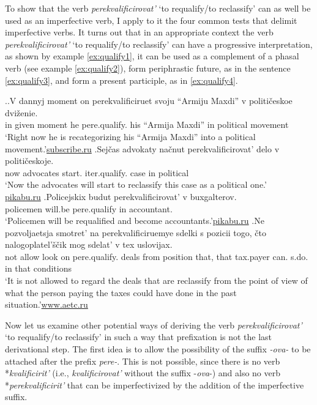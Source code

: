 To show that the verb \textit{perekvalificirovat'} `to requalify/to reclassify' can as well be used as an imperfective verb, I apply to it the four common tests that delimit imperfective verbs. It turns out that in an appropriate context the verb \textit{perekvalificirovat'} `to requalify/to reclassify' can have a progressive interpretation, as shown by example \ref{ex:qualify1}, it can be used as a complement of a phasal verb (see example \ref{ex:qualify2}), form periphrastic future, as in the sentence \ref{ex:qualify3}, and form a present participle, as in \ref{ex:qualify4}. 

\ex.\label{ex:qualify}\ag.\label{ex:qualify1}V dannyj moment on perekvalificiruet\textsuperscript{\IPF} svoju {``Armiju Maxdi''} v politi\v{c}eskoe dvi\v{z}enie.\\
in given moment he pere.qualify. his {``Armija Maxdi''} in political movement\\
\trans `Right now he is recategorizing his ``Armija Maxdi'' into a political movement.'\hbox{}\hfill\hbox{\url{subscribe.ru}}
\bg.\label{ex:qualify2}Sej\v{c}as advokaty na\v{c}nut perekvalificirovat'\textsuperscript{\IPF} delo v politi\v{c}eskoje.\\
now advocates start. iter.qualify. case in political\\
\trans `Now the advocates will start to reclassify this case as a political one.'\\\hbox{}\hfill\hbox{\url{pikabu.ru}}
\bg.\label{ex:qualify3}Policejskix budut perekvalificirovat'\textsuperscript{\IPF} v buxgalterov.\\	
policemen will.be pere.qualify in accountant.\\
\trans `Policemen will be requalified and become accountants.'\hbox{}\hfill\hbox{\url{pikabu.ru}}
\bg.\label{ex:qualify4}Ne pozvoljaetsja smotret’ na perekvalificiruemye sdelki s pozicii togo, \v{c}to nalogoplatel’\v{s}\v{c}ik mog sdelat’ v tex uslovijax.\\
not allow look on pere.qualify. deals from position that, that tax.payer can. s.do. in that conditions\\
\trans `It is not allowed to regard the deals that are reclassify from the point of view of what the person paying the taxes could have done in the past situation.'\hbox{}\hfill\hbox{\url{www.aetc.ru}}

Now let us examine other potential ways of deriving the verb \textit{perekvalificirovat'} `to requalify/to reclassify' in such a way that prefixation is not the last derivational step. The first idea is to allow the possibility of the suffix \textit{-ova-} to be attached after the prefix \textit{pere-}. This is not possible, since there is no verb *\textit{kvalificirit'} (i.e., \textit{kvalificirovat'} without the suffix -\textit{ova}-) and also no verb  *\textit{perekvalificirit'} that can be imperfectivized by the addition of the imperfective suffix.

